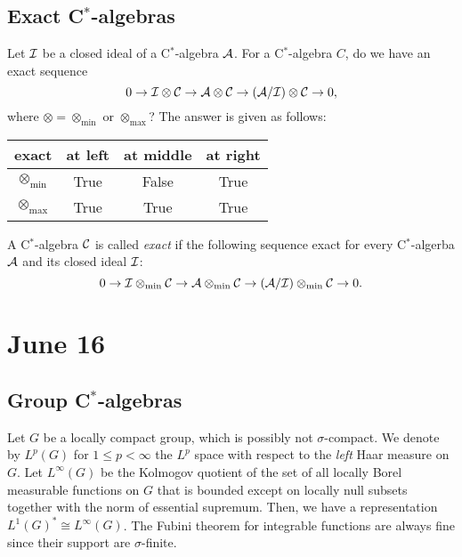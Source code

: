 \documentclass{../../small}
\begin{document}
\subsection{Exact C$^*$-algebras}


Let $\mathcal{I}$ be a closed ideal of a C$^*$-algebra $\mathcal{A}$.
For a C$^*$-algebra $C$, do we have an exact sequence
\[0\to\mathcal{I}\otimes\mathcal{C}\to\mathcal{A}\otimes\mathcal{C}\to(\mathcal{A}/\mathcal{I})\otimes\mathcal{C}\to0,\]
where $\otimes=\otimes_{\min}$ or $\otimes_{\max}$?
The answer is given as follows:
\begin{center}
\begin{tabular}{c|ccc}
exact&at left&at middle&at right\\\hline
$\otimes_{\min}$&True&False&True\\
$\otimes_{\max}$&True&True&True
\end{tabular}
\end{center}

\begin{defn}
A C$^*$-algebra $\mathcal{C}$ is called \emph{exact} if the following sequence exact for every C$^*$-algerba $\mathcal{A}$ and its closed ideal $\mathcal{I}$:
\[0\to\mathcal{I}\otimes_{\min}\mathcal{C}\to\mathcal{A}\otimes_{\min}\mathcal{C}\to(\mathcal{A}/\mathcal{I})\otimes_{\min}\mathcal{C}\to0.\]
\end{defn}

\iffalse
\[(\cA/\cI)\otimes_\alpha\cB\xrightarrow{\sim}\frac{\cA\otimes_{\max}\cB}{\cI\otimes_{\max}\cB}\to(\cA/\cI)\otimes_{\max}\cB.\]
\fi











\newpage
\section{June 16}

\subsection{Group C$^*$-algebras}

Let $G$ be a locally compact group, which is possibly not $\sigma$-compact.
We denote by $L^p(G)$ for $1\le p<\infty$ the $L^p$ space with respect to the \emph{left} Haar measure on $G$.
Let $L^\infty(G)$ be the Kolmogov quotient of the set of all locally Borel measurable functions on $G$ that is bounded except on locally null subsets together with the norm of essential supremum.
Then, we have a representation $L^1(G)^*\cong L^\infty(G)$.
The Fubini theorem for integrable functions are always fine since their support are $\sigma$-finite.
\end{document}
